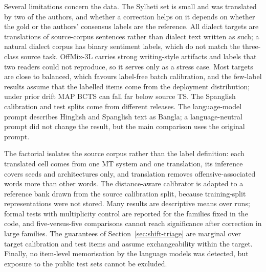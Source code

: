 Several limitations concern the data. The Sylheti set is small and was translated by two of the authors, and whether a
correction helps on it depends on whether the gold or the authors' consensus labels are the reference. All dialect targets are translations of source-corpus sentences rather than
dialect text written as such; a natural dialect corpus \citep{jawad2025benchmarking} has binary sentiment labels,
which do not match the three-class source task. OffMix-3L
carries strong writing-style artifacts and labels that two readers could not reproduce, so it serves only as a stress
case. Most targets are close to balanced, which favours label-free batch calibration, and the few-label results assume
that the labelled items come from the deployment distribution; under prior drift MAP BCTS can fall far below source TS.
The Spanglish calibration and test splits come from different releases. The language-model prompt describes Hinglish
and Spanglish text as Bangla; a language-neutral prompt did not change the result, but the main comparison uses the
original prompt.

The factorial isolates the source corpus rather than the label definition: each translated cell comes from one MT
system and one translation, its inference covers seeds and architectures only, and translation removes
offensive-associated words more than other words. The distance-aware calibrator is adapted to a reference bank drawn
from the source calibration split, because training-split representations were not stored. Many results are
descriptive means over runs; formal tests with multiplicity control are reported for the families fixed in the code,
and five-versus-five comparisons cannot reach significance after correction in large families. The guarantees of
Section~\ref{sec:shift-triage} are marginal over target calibration and test items and assume exchangeability within
the target. Finally, no item-level memorisation by the language models was detected, but exposure to the public test
sets cannot be excluded.
